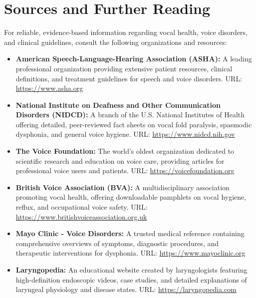 \section*{Sources and Further Reading}
For reliable, evidence-based information regarding vocal health, voice disorders, and clinical guidelines, consult the following organizations and resources:
\begin{itemize}
    \item \textbf{American Speech-Language-Hearing Association (ASHA):} A leading professional organization providing extensive patient resources, clinical definitions, and treatment guidelines for speech and voice disorders. URL: \url{https://www.asha.org}
    \item \textbf{National Institute on Deafness and Other Communication Disorders (NIDCD):} A branch of the U.S. National Institutes of Health offering detailed, peer-reviewed fact sheets on vocal fold paralysis, spasmodic dysphonia, and general voice hygiene. URL: \url{https://www.nidcd.nih.gov}
    \item \textbf{The Voice Foundation:} The world's oldest organization dedicated to scientific research and education on voice care, providing articles for professional voice users and patients. URL: \url{https://voicefoundation.org}
    \item \textbf{British Voice Association (BVA):} A multidisciplinary association promoting vocal health, offering downloadable pamphlets on vocal hygiene, reflux, and occupational voice safety. URL: \url{https://www.britishvoiceassociation.org.uk}
    \item \textbf{Mayo Clinic - Voice Disorders:} A trusted medical reference containing comprehensive overviews of symptoms, diagnostic procedures, and therapeutic interventions for dysphonia. URL: \url{https://www.mayoclinic.org}
    \item \textbf{Laryngopedia:} An educational website created by laryngologists featuring high-definition endoscopic videos, case studies, and detailed explanations of laryngeal physiology and disease states. URL: \url{https://laryngopedia.com}
\end{itemize}